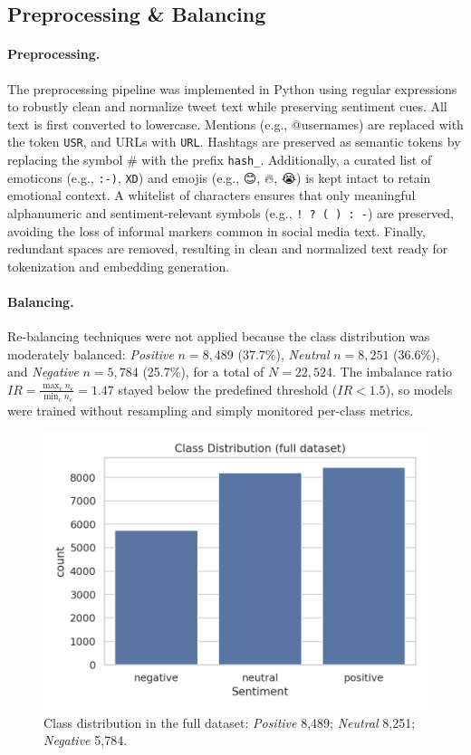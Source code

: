 \documentclass[10pt]{article}
\begin{document}
\subsection{Preprocessing \& Balancing}
\paragraph{Preprocessing.}
The preprocessing pipeline was implemented in Python using regular expressions to robustly clean and normalize tweet text while preserving sentiment cues.
All text is first converted to lowercase. Mentions (e.g., @usernames) are replaced with the token \texttt{USR}, and URLs with \texttt{URL}.
Hashtags are preserved as semantic tokens by replacing the symbol \# with the prefix \texttt{hash\_}.
Additionally, a curated list of emoticons (e.g., \texttt{:-)}, \texttt{XD}) and emojis (e.g., 😊, 🔥, 😭) is kept intact to retain emotional context.
A whitelist of characters ensures that only meaningful alphanumeric and sentiment-relevant symbols (e.g., \texttt{! ? ( ) : -}) are preserved, avoiding the loss of informal markers common in social media text.
Finally, redundant spaces are removed, resulting in clean and normalized text ready for tokenization and embedding generation.
\paragraph{Balancing.}
Re-balancing techniques were not applied because the class distribution was moderately balanced: \textit{Positive} $n=8{,}489$ (37.7\%), \textit{Neutral} $n=8{,}251$ (36.6\%), and \textit{Negative} $n=5{,}784$ (25.7\%), for a total of $N=22{,}524$. The imbalance ratio
$IR=\frac{\max_c n_c}{\min_c n_c}=1.47$ stayed below the predefined threshold ($IR<1.5$), so models were trained without resampling and simply monitored per-class metrics.
\begin{figure}[H]
  \centering
  \includegraphics[width=0.6\linewidth]{../SCRITPS/artifacts/figures/class_distribution_full.png}
  \caption{Class distribution in the full dataset: \textit{Positive} 8{,}489; \textit{Neutral} 8{,}251; \textit{Negative} 5{,}784.}
  \label{fig:class-dist}
\end{figure}
\end{document}
